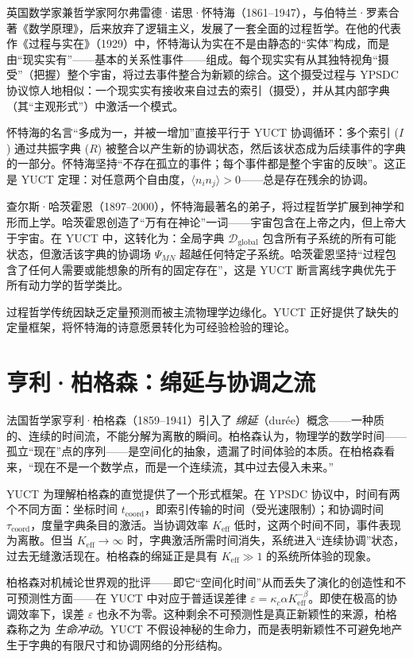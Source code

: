 \documentclass[12pt,a4paper]{article}
\begin{document}
	英国数学家兼哲学家阿尔弗雷德·诺思·怀特海（1861–1947），与伯特兰·罗素合著《数学原理》，后来放弃了逻辑主义，发展了一套全面的过程哲学。在他的代表作《过程与实在》（1929）中，怀特海认为实在不是由静态的“实体”构成，而是由“现实实有”——基本的关系性事件——组成。每个现实实有从其独特视角“摄受”（把握）整个宇宙，将过去事件整合为新颖的综合。这个摄受过程与 YPSDC 协议惊人地相似：一个现实实有接收来自过去的索引（摄受），并从其内部字典（其“主观形式”）中激活一个模式。
	
	怀特海的名言“多成为一，并被一增加”直接平行于 YUCT 协调循环：多个索引 (\(I\)) 通过共振字典 (\(R\)) 被整合以产生新的协调状态，然后该状态成为后续事件的字典的一部分。怀特海坚持“不存在孤立的事件；每个事件都是整个宇宙的反映”。这正是 YUCT 定理：对任意两个自由度，\(\langle n_i n_j \rangle > 0\)——总是存在残余的协调。
	
	查尔斯·哈茨霍恩（1897–2000），怀特海最著名的弟子，将过程哲学扩展到神学和形而上学。哈茨霍恩创造了“万有在神论”一词——宇宙包含在上帝之内，但上帝大于宇宙。在 YUCT 中，这转化为：全局字典 \(\mathcal{D}_{\text{global}}\) 包含所有子系统的所有可能状态，但激活该字典的协调场 \(\Psi_{MN}\) 超越任何特定子系统。哈茨霍恩坚持“过程包含了任何人需要或能想象的所有的固定存在”，这是 YUCT 断言离线字典优先于所有动力学的哲学类比。
	
	过程哲学传统因缺乏定量预测而被主流物理学边缘化。YUCT 正好提供了缺失的定量框架，将怀特海的诗意愿景转化为可经验检验的理论。
	
	\section{亨利·柏格森：绵延与协调之流}
	
	法国哲学家亨利·柏格森（1859–1941）引入了 \emph{绵延}（durée）概念——一种质的、连续的时间流，不能分解为离散的瞬间。柏格森认为，物理学的数学时间——孤立“现在”点的序列——是空间化的抽象，遗漏了时间体验的本质。在柏格森看来，“现在不是一个数学点，而是一个连续流，其中过去侵入未来。”
	
	YUCT 为理解柏格森的直觉提供了一个形式框架。在 YPSDC 协议中，时间有两个不同方面：坐标时间 \(t_{\text{coord}}\)，即索引传输的时间（受光速限制）；和协调时间 \(\tau_{\text{coord}}\)，度量字典条目的激活。当协调效率 \(K_{\mathrm{eff}}\) 低时，这两个时间不同，事件表现为离散。但当 \(K_{\mathrm{eff}} \to \infty\) 时，字典激活所需时间消失，系统进入“连续协调”状态，过去无缝激活现在。柏格森的绵延正是具有 \(K_{\mathrm{eff}} \gg 1\) 的系统所体验的现象。
	
	柏格森对机械论世界观的批评——即它“空间化时间”从而丢失了演化的创造性和不可预测性方面——在 YUCT 中对应于普适误差律 \(\varepsilon = \kappa_c \alpha K_{\mathrm{eff}}^{-\beta}\)。即使在极高的协调效率下，误差 \(\varepsilon\) 也永不为零。这种剩余不可预测性是真正新颖性的来源，柏格森称之为 \emph{生命冲动}。YUCT 不假设神秘的生命力，而是表明新颖性不可避免地产生于字典的有限尺寸和协调网络的分形结构。
	
\end{document}
